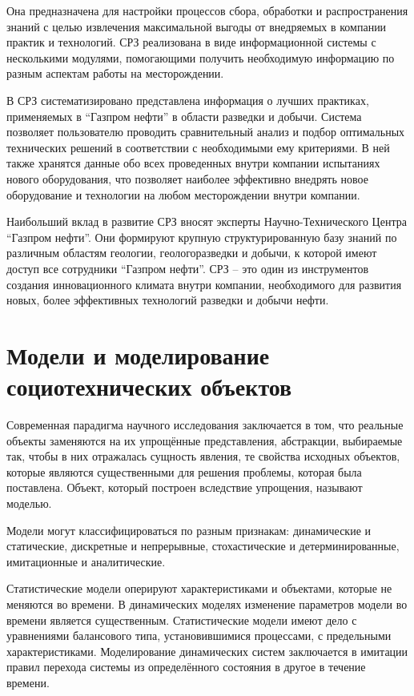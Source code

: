 Она предназначена для настройки процессов сбора, обработки и распространения знаний с целью извлечения максимальной выгоды от внедряемых в компании практик и технологий.
СРЗ реализована в виде информационной системы с несколькими модулями, помогающими получить необходимую информацию по разным аспектам работы на месторождении. 

В СРЗ систематизировано представлена информация о лучших практиках, применяемых в ``Газпром нефти'' в области разведки и добычи. Система позволяет пользователю проводить сравнительный анализ и подбор оптимальных технических решений в соответствии с необходимыми ему критериями. В ней также хранятся данные обо всех проведенных внутри компании испытаниях нового оборудования, что позволяет наиболее эффективно внедрять новое оборудование и технологии на любом месторождении внутри компании. 

Наибольший вклад в развитие СРЗ вносят эксперты Научно-Технического Центра ``Газпром нефти''. Они формируют крупную структурированную базу знаний по различным областям геологии, геологоразведки и добычи, к которой имеют доступ все сотрудники ``Газпром нефти''. СРЗ – это один из инструментов создания инновационного климата внутри компании, необходимого для развития новых, более эффективных технологий разведки и добычи нефти. 

\section{Модели и моделирование социотехнических объектов}

Современная парадигма научного исследования заключается в том, что реальные объекты заменяются на их упрощённые представления, абстракции, выбираемые так, чтобы в них отражалась сущность явления, те свойства исходных объектов, которые являются существенными для решения проблемы, которая была поставлена. 
Объект, который построен вследствие упрощения, называют моделью.

Модели могут классифицироваться по разным признакам: динамические и статические, дискретные и непрерывные, стохастические и детерминированные, имитационные и аналитические. 

Статистические модели оперируют характеристиками и объектами, которые не меняются во времени. 
В динамических моделях изменение параметров модели во времени является существенным.
Статистические модели имеют дело с уравнениями балансового типа, установившимися процессами, с предельными характеристиками.
Моделирование динамических систем заключается в имитации правил перехода системы из определённого состояния в другое в течение времени.

